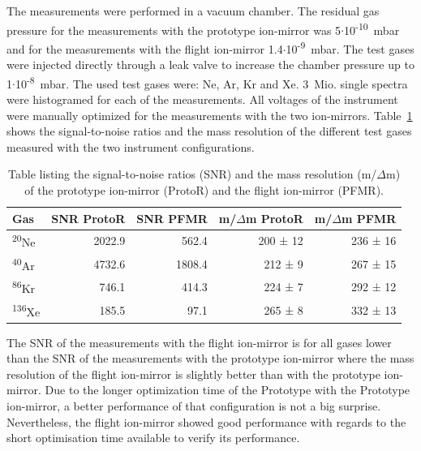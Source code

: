 	The measurements were performed in a vacuum chamber. The residual gas pressure for the measurements with the prototype ion-mirror was 5$\cdot$10\textsuperscript{-10}~mbar and for the measurements with the flight ion-mirror 1.4$\cdot$10\textsuperscript{-9}~mbar. The test gases were injected directly through a leak valve to increase the chamber pressure up to 1$\cdot$10\textsuperscript{-8}~mbar. The used test gases were: Ne, Ar, Kr and Xe. 3~Mio. single spectra were histogramed for each of the measurements. All voltages of the instrument were manually optimized for the measurements with the two ion-mirrors. Table~\ref{tab:refPerftab} shows the signal-to-noise ratios and the mass resolution of the different test gases measured with the two instrument configurations.\\
	\begin{table}
		\begin{center}
		\begin{tabular}{|l|r|r|r|r|}
			\hline
			Gas						&SNR ProtoR	&SNR PFMR	&m/$\Delta$m ProtoR	&m/$\Delta$m PFMR\\
			\hline
			\textsuperscript{20}Ne	&2022.9		&562.4		&200 ± 12		&236 ± 16\\
			\textsuperscript{40}Ar	&4732.6		&1808.4		&212 ±  9		&267 ± 15\\
			\textsuperscript{86}Kr	&746.1		&414.3		&224 ±  7		&292 ± 12\\
			\textsuperscript{136}Xe	&185.5		&97.1		&265 ±  8		&332 ± 13\\
			\hline
		\end{tabular}
		\end{center}
		\caption{Table listing the signal-to-noise ratios (SNR) and the mass resolution (m/$\Delta$m) of the prototype ion-mirror (ProtoR) and the flight ion-mirror (PFMR).}
		\label{tab:refPerftab}
	\end{table}
	The SNR of the measurements with the flight ion-mirror is for all gases lower than the SNR of the measurements with the prototype ion-mirror where the mass resolution of the flight ion-mirror is slightly better than with the prototype ion-mirror. Due to the longer optimization time of the Prototype with the Prototype ion-mirror, a better performance of that configuration is not a big surprise. Nevertheless, the flight ion-mirror showed good performance with regards to the short optimisation time available to verify its performance.
	
	

